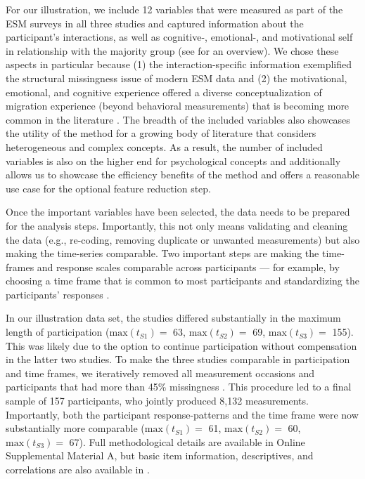 For our illustration, we include 12 variables that were measured as part
of the ESM surveys in all three studies and captured information about
the participant's interactions, as well as cognitive-, emotional-, and
motivational self in relationship with the majority group (see
 for an overview). We chose these aspects in
particular because (1) the interaction-specific information exemplified
the structural missingness issue of modern ESM data and (2) the
motivational, emotional, and cognitive experience offered a diverse
conceptualization of migration experience (beyond behavioral
measurements) that is becoming more common in the literature
\citep[][]{Kreienkamp2022d}. The breadth of the included variables also
showcases the utility of the method for a growing body of literature
that considers heterogeneous and complex concepts. As a result, the
number of included variables is also on the higher end for psychological
concepts and additionally allows us to showcase the efficiency benefits
of the method and offers a reasonable use case for the optional feature
reduction step.



Once the important variables have been selected, the data needs to be
prepared for the analysis steps. Importantly, this not only means
validating and cleaning the data (e.g., re-coding, removing duplicate or
unwanted measurements) but also making the time-series comparable. Two
important steps are making the time-frames and response scales
comparable across participants --- for example, by choosing a time frame
that is common to most participants and standardizing the participants'
responses
\citep['data exclusion' and 'data transformation' in ; also see][]{liao2005}.

In our illustration data set, the studies differed substantially in the
maximum length of participation (\(\text{max}(t_{S1})=\) 63,
\(\text{max}(t_{S2})=\) 69, \(\text{max}(t_{S3})=\) 155). This was
likely due to the option to continue participation without compensation
in the latter two studies. To make the three studies comparable in
participation and time frames, we iteratively removed all measurement
occasions and participants that had more than 45\% missingness
\citep[which was in line with the general recommendation for data that might still need to rely on imputations for later model testing][]{Madley-Dowd2019}.
This procedure led to a final sample of 157 participants, who jointly
produced 8,132 measurements. Importantly, both the participant
response-patterns and the time frame were now substantially more
comparable (\(\text{max}(t_{S1})=\) 61, \(\text{max}(t_{S2})=\) 60,
\(\text{max}(t_{S3})=\) 67). Full methodological details are available
in Online Supplemental Material A, but basic item information,
descriptives, and correlations are also available in
.


